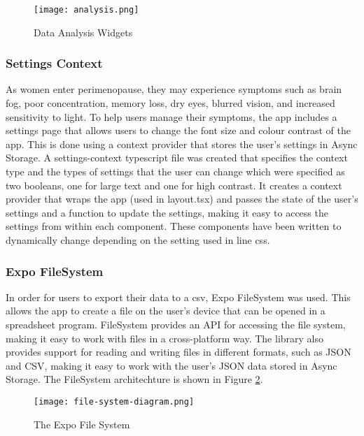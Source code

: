 \begin{figure}[h!!]
  \begin{center}
    \texttt{[image: analysis.png]}
    \caption{Data Analysis Widgets}
    \label{figure:analysis}
  \end{center}
\end{figure}

\subsubsection{Settings Context}
As women enter perimenopause, they may experience symptoms such as brain fog, poor concentration, memory loss, dry eyes, blurred vision, and increased sensitivity to light. To help users manage their symptoms, the app includes a settings page that allows users to change the font size and colour contrast of the app. This is done using a context provider that stores the user's settings in Async Storage. A settings-context typescript file was created that specifies the context type and the types of settings that the user can change which were specified as two booleans, one for large text and one for high contrast. It creates a context provider that wraps the app (used in layout.tsx) and passes the state of the user's settings and a function to update the settings, making it easy to access the settings from within each component. These components have been written to dynamically change depending on the setting used in line css. 

\subsubsection{Expo FileSystem}
In order for users to export their data to a csv, Expo FileSystem was used. This allows the app to create a file on the user's device that can be opened in a spreadsheet program. FileSystem provides an API for accessing the file system, making it easy to work with files in a cross-platform way. The library also provides support for reading and writing files in different formats, such as JSON and CSV, making it easy to work with the user's JSON data stored in Async Storage. The FileSystem architechture is shown in Figure \ref{figure:file-system-diagram}.

\begin{figure}[h!!]
    \begin{center}
      \texttt{[image: file-system-diagram.png]}
      \caption{The Expo File System\cite{ExpoFileSystem2025}}
      \label{figure:file-system-diagram}
    \end{center}
  \end{figure}

